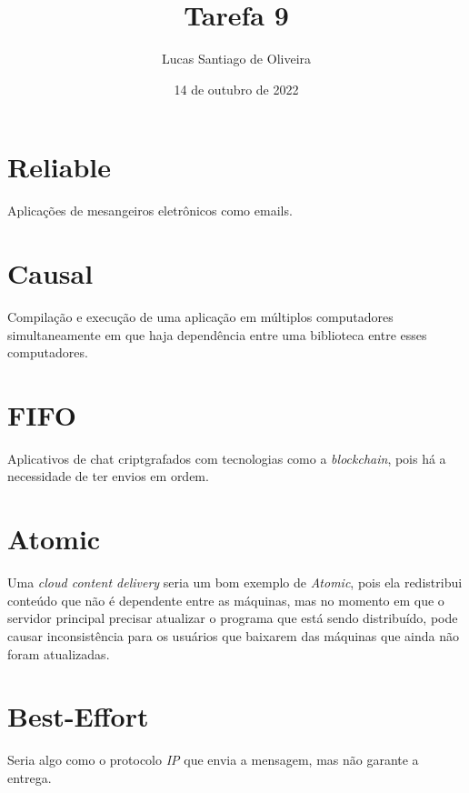 \documentclass{article}
\title{Tarefa 9}
\author{Lucas Santiago de Oliveira}
\date{14 de outubro de 2022}
\begin{document}
    \maketitle

    \section*{Reliable}
    Aplicações de mesangeiros eletrônicos como emails.

    \section*{Causal}
    Compilação e execução de uma aplicação em múltiplos computadores simultaneamente
    em que haja dependência entre uma biblioteca entre esses computadores.

    \section*{FIFO}
    Aplicativos de chat criptgrafados com tecnologias como a \emph{blockchain},
    pois há a necessidade de ter envios em ordem.

    \section*{Atomic}
    Uma \emph{cloud content delivery} seria um bom exemplo de \emph{Atomic}, pois
    ela redistribui conteúdo que não é dependente entre as máquinas, mas no momento em
    que o servidor principal precisar atualizar o programa que está sendo distribuído,
    pode causar inconsistência para os usuários que baixarem das máquinas que ainda não
    foram atualizadas.

    \section*{Best-Effort}
    Seria algo como o protocolo \emph{IP} que envia a mensagem, mas não garante a entrega.
\end{document}
